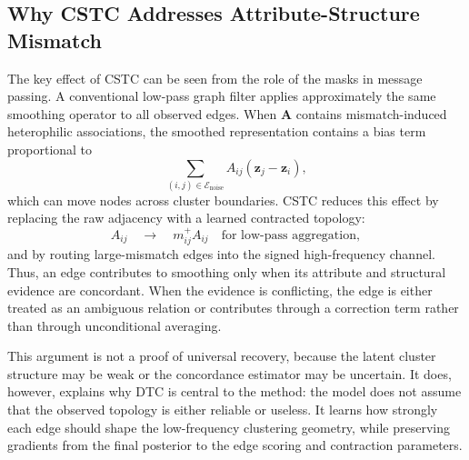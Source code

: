 \subsection{Why CSTC Addresses Attribute-Structure Mismatch}
\label{subsec:why-it-works}

The key effect of CSTC can be seen from the role of the masks in message passing. A conventional low-pass graph filter applies approximately the same smoothing operator to all observed edges. When $\mathbf{A}$ contains mismatch-induced heterophilic associations, the smoothed representation contains a bias term proportional to
\begin{equation}
  \sum_{(i,j)\in\mathcal{E}_{\mathrm{noise}}}
  A_{ij}(\mathbf{z}_j-\mathbf{z}_i),
\end{equation}
which can move nodes across cluster boundaries. CSTC reduces this effect by replacing the raw adjacency with a learned contracted topology:
\begin{equation}
  A_{ij}
  \quad\longrightarrow\quad
  m^{+}_{ij}A_{ij}
  \quad\text{for low-pass aggregation},
\end{equation}
and by routing large-mismatch edges into the signed high-frequency channel. Thus, an edge contributes to smoothing only when its attribute and structural evidence are concordant. When the evidence is conflicting, the edge is either treated as an ambiguous relation or contributes through a correction term rather than through unconditional averaging.

This argument is not a proof of universal recovery, because the latent cluster structure may be weak or the concordance estimator may be uncertain. It does, however, explains why DTC is central to the method: the model does not assume that the observed topology is either reliable or useless. It learns how strongly each edge should shape the low-frequency clustering geometry, while preserving gradients from the final posterior to the edge scoring and contraction parameters.
